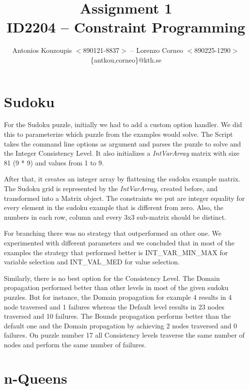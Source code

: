 \documentclass[a4paper, 11pt]{article}
\begin{document}
\title{Assignment 1\\ID2204 -- Constraint Programming}

\author{Antonios Kouzoupis $<$890121-8837$>$ -- Lorenzo Corneo $<$890225-1290$>$\\\{antkou,corneo\}$@$kth.se}

\maketitle

\section{Sudoku}

For the Sudoku puzzle, initially we had to add a custom option
handler. We did this to parameterize which puzzle from the examples
would solve. The Script takes the command line options as argument and
parses the puzzle to solve and the Integer Consistency Level. It
also initializes a \emph{IntVarArray} matrix with size 81 (9 * 9) and
values from 1 to 9.

After that, it creates an integer array by flattening the sudoku
example matrix. The Sudoku grid is represented by the
\emph{IntVarArray}, created before, and transformed into a Matrix
object. The constraints we put are integer equality for every element
in the sudoku example that is different from zero. Also, the numbers
in each row, column and every 3x3 sub-matrix should be distinct.

For branching there was no strategy that outperformed an other one. We
experimented with different parameters and we concluded that in most
of the examples the strategy that performed better is
INT\_VAR\_MIN\_MAX for variable selection and INT\_VAL\_MED for value
selection.

Similarly, there is no best option for the Consistency Level. The
Domain propagation performed better than other levels in most of the
given sudoku puzzles. But for instance, the Domain propagation for example
4 results in 4 node traversed and 1 failures whereas the Default level
results in 23 nodes traversed and 10 failures. The Bounds
propagation performs better than the default one and the Domain
propagation by achieving 2 nodes
traversed and 0 failures. On puzzle number 17 all Consistency levels
traverse the same number of nodes and perform the same number of
failures.

\section{n-Queens}
\end{document}
